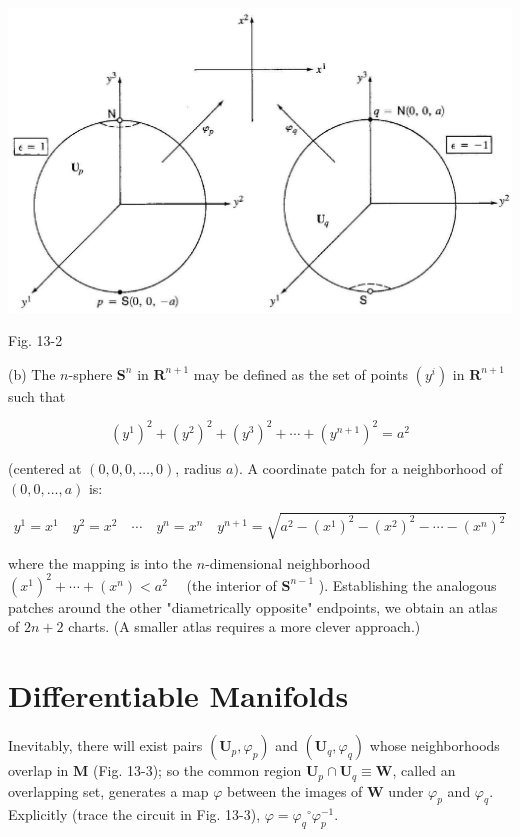 \documentclass[10pt]{article}
\begin{document}
\begin{center}
\includegraphics[max width=\textwidth]{2024_04_03_41f90be4f896e21f0dc9g-205}
\end{center}

Fig. 13-2

(b) The $n$-sphere $\mathbf{S}^{n}$ in $\mathbf{R}^{n+1}$ may be defined as the set of points $\left(y^{i}\right)$ in $\mathbf{R}^{n+1}$ such that

$$
\left(y^{1}\right)^{2}+\left(y^{2}\right)^{2}+\left(y^{3}\right)^{2}+\cdots+\left(y^{n+1}\right)^{2}=a^{2}
$$

(centered at $(0,0,0, \ldots, 0)$, radius $a)$. A coordinate patch for a neighborhood of $(0,0, \ldots, a)$ is:

$$
y^{1}=x^{1} \quad y^{2}=x^{2} \quad \cdots \quad y^{n}=x^{n} \quad y^{n+1}=\sqrt{a^{2}-\left(x^{1}\right)^{2}-\left(x^{2}\right)^{2}-\cdots-\left(x^{n}\right)^{2}}
$$

where the mapping is into the $n$-dimensional neighborhood $\left(x^{1}\right)^{2}+\cdots+\left(x^{n}\right)<a^{2} \quad$ (the interior of $\mathbf{S}^{n-1}$ ). Establishing the analogous patches around the other "diametrically opposite" endpoints, we obtain an atlas of $2 n+2$ charts. (A smaller atlas requires a more clever approach.)

\section*{Differentiable Manifolds}
Inevitably, there will exist pairs $\left(\mathbf{U}_{p}, \varphi_{p}\right)$ and $\left(\mathbf{U}_{q}, \varphi_{q}\right)$ whose neighborhoods overlap in $\mathbf{M}$ (Fig. 13-3); so the common region $\mathbf{U}_{p} \cap \mathbf{U}_{q} \equiv \mathbf{W}$, called an overlapping set, generates a map $\varphi$ between the images of $\mathbf{W}$ under $\varphi_{p}$ and $\varphi_{q}$. Explicitly (trace the circuit in Fig. 13-3), $\varphi=\varphi_{q}{ }^{\circ} \varphi_{p}^{-1}$.
\end{document}
